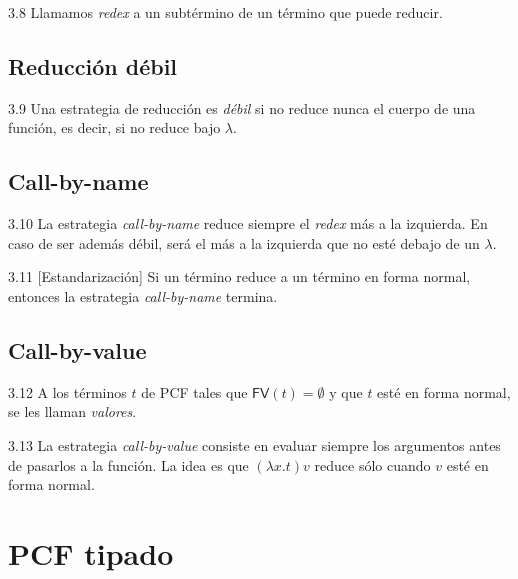 \documentclass[twoside,a4paper,12pt]{article}
\theoremstyle{definition}
\theoremstyle{remark}
\newcommand\fun[2]{\ensuremath{\lambda {#1}{.}{#2}}}
\newcommand\FV{\ensuremath{\mathsf{FV}}}
\begin{document}
\begin{definicion}{3.8}
  Llamamos \emph{redex} a un subtérmino de un término que puede reducir.
\end{definicion}

\subsection*{Reducción débil}

\begin{definicion}{3.9}
  Una estrategia de reducción es \emph{débil} si no reduce nunca el cuerpo de
  una función, es decir, si no reduce bajo $\lambda$.
\end{definicion}

\subsection*{Call-by-name}

\begin{definicion}{3.10}
  La estrategia \emph{call-by-name} reduce siempre el \emph{redex} más a la
  izquierda. En caso de ser además débil, será el más a la izquierda que no esté
  debajo de un $\lambda$.
\end{definicion}

\begin{teorema}{3.11}
  [Estandarización] Si un término reduce a un término en forma normal, entonces
  la estrategia \emph{call-by-name} termina.
\end{teorema}

\subsection*{Call-by-value}

\begin{definicion}{3.12}
  A los términos $t$ de PCF tales que $\FV(t)=\emptyset$ y que $t$ esté en forma
  normal, se les llaman \emph{valores}.
\end{definicion}

\begin{definicion}{3.13}
  La estrategia \emph{call-by-value} consiste en evaluar siempre los argumentos
  antes de pasarlos a la función. La idea es que $(\fun xt)v$
  reduce sólo cuando $v$ esté en forma normal.
\end{definicion}

\newpage
\section*{PCF tipado}
\end{document}

